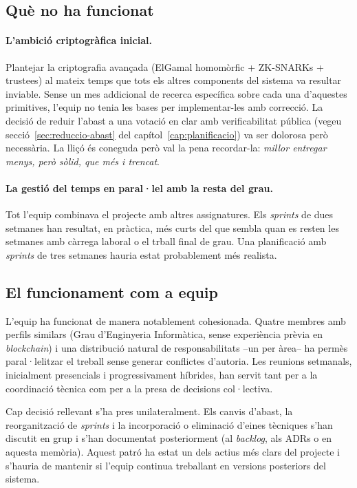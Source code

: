 \subsection{Què no ha funcionat}

\paragraph{L'ambició criptogràfica inicial.} Plantejar la
criptografia avançada (ElGamal homomòrfic + ZK-SNARKs + trustees) al
mateix temps que tots els altres components del sistema va resultar
inviable. Sense un mes addicional de recerca específica sobre cada
una d'aquestes primitives, l'equip no tenia les bases per
implementar-les amb correcció. La decisió de reduir l'abast a una
votació en clar amb verificabilitat pública (vegeu
secció~\ref{sec:reduccio-abast} del capítol~\ref{cap:planificacio}) va
ser dolorosa però necessària. La lliçó és coneguda però val la pena
recordar-la: \emph{millor entregar menys, però sòlid, que més i
trencat}.

\paragraph{La gestió del temps en paral·lel amb la resta del grau.}
Tot l'equip combinava el projecte amb altres assignatures. Els
\emph{sprints} de dues setmanes han resultat, en pràctica, més curts
del que sembla quan es resten les setmanes amb càrrega laboral o
el trball final de grau. Una planificació amb \emph{sprints} de
tres setmanes hauria estat probablement més realista.

\subsection{El funcionament com a equip}

L'equip ha funcionat de manera notablement cohesionada. Quatre
membres amb perfils similars (Grau d'Enginyeria Informàtica, sense
experiència prèvia en \emph{blockchain}) i una distribució natural
de responsabilitats --un per àrea-- ha permès paral·lelitzar el
treball sense generar conflictes d'autoria. Les reunions setmanals,
inicialment presencials i progressivament híbrides, han servit tant
per a la coordinació tècnica com per a la presa de decisions
col·lectiva.

Cap decisió rellevant s'ha pres unilateralment. Els canvis d'abast,
la reorganització de \emph{sprints} i la incorporació o eliminació
d'eines tècniques s'han discutit en grup i s'han documentat
posteriorment (al \emph{backlog}, als \acp{ADR} o en aquesta
memòria). Aquest patró ha estat un dels actius més clars del
projecte i s'hauria de mantenir si l'equip continua treballant en
versions posteriors del sistema.

